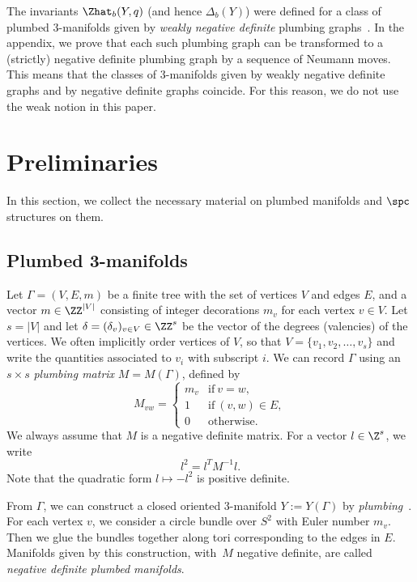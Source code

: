 \documentclass[pdftex]{sigma}
\begin{document}
The invariants $\Zhat_b(Y,q)$ (and hence $\Delta_b(Y)$) were defined for a class of plumbed 3-manifolds given by \emph{weakly negative definite} plumbing graphs~\cite[Definition~4.3]{GM21}. In the appendix, we prove that each such plumbing graph can be transformed to a (strictly) negative definite plumbing graph by a sequence of Neumann moves. This means that the classes of 3-manifolds given by weakly negative definite graphs and by negative definite graphs coincide. For this reason, we do not use the weak notion in this paper.

\section{Preliminaries}

In this section, we collect the necessary material on plumbed manifolds and $\spc$ structures on them.

\subsection{Plumbed 3-manifolds}\label{ss:plumbing}

Let $\Gamma = (V,E,m)$ be a finite tree with the set of vertices $V$ and edges $E$, and a vector $m \in \ZZ^{\lvert V \rvert}$ consisting of integer decorations $m_v$ for each vertex $v \in V$. Let $s = \lvert V\rvert$ and let $\delta = (\delta_v)_{v \in V} \in \ZZ^s$ be the vector of the degrees (valencies) of the vertices. We often implicitly order vertices of $V$, so that $V = \{v_1,v_2,\dots,v_s\}$ and write the quantities associated to $v_i$ with subscript $i$.
We can record $\Gamma$ using an $s\times s$ \emph{plumbing matrix} $M=M(\Gamma)$, defined by
\[
 M_{vw} =
 \begin{cases}
 m_v & \text{if} \ v = w, \\
 1 & \text{if} \ (v, w) \in E, \\
 0 & \text{otherwise.}
 \end{cases}
\]
We always assume that $M$ is a negative definite matrix. For a vector $l \in \Z^s$, we write
\[
 l^2 = l^T M^{-1}l.
\]
Note that the quadratic form $l \mapsto -l^2$ is positive definite.

From $\Gamma$, we can construct a closed oriented 3-manifold $Y := Y(\Gamma)$ by \emph{plumbing}~\cite{Neu81}. For each vertex $v$, we consider a circle bundle over $S^2$ with Euler number $m_v$. Then we glue the bundles together along tori corresponding to the edges in $E$. Manifolds given by this construction, with~$M$ negative definite, are called \emph{negative definite plumbed manifolds}.
\end{document}
